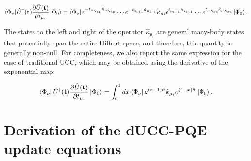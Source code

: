 \documentclass[aps,prx, reprint]{revtex4-2}
\newcommand*{\qucc}{dUCC\xspace}
\begin{document}
\begin{widetext}
\begin{equation}
\begin{split}
\bra{\Phi_\nu} \hat{U}^\dagger(\mathbf{t}) \frac{\partial \hat{U}(\mathbf{t})}{\partial t_{\mu_i}}  \ket{\Phi_0}
=
\bra{\Phi_\nu}
e^{-t_{\mu_{N_\mathrm{op}}} \hat{\kappa}_{\mu_{N_\mathrm{op}}}}
\cdots
e^{-t_{\mu_{i+1}} \hat{\kappa}_{\mu_{i+1}}}
\hat{\kappa}_{\mu_i}
e^{t_{\mu_{i+1}} \hat{\kappa}_{\mu_{i+1}}}
\cdots
e^{t_{\mu_{N_\mathrm{op}}} \hat{\kappa}_{\mu_{N_\mathrm{op}}}}\ket{\Phi_0}.
\end{split}
\end{equation}
\end{widetext}
The states to the left and right of the operator $\hat{\kappa}_{\mu_i}$ are general many-body states that potentially span the entire Hilbert space, and therefore, this quantity is generally non-null.
For completeness, we also report the same expression for the case of traditional UCC, which may be obtained using the derivative of the exponential map:
\begin{widetext}
\begin{equation}
\begin{split}
\bra{\Phi_\nu} \hat{U}^\dagger(\mathbf{t}) \frac{\partial \hat{U}(\mathbf{t})}{\partial t_{\mu_i}}  \ket{\Phi_0}
=
\int_0^1
dx
\bra{\Phi_\nu}
e^{(x - 1)\hat{\sigma}}
\hat{\kappa}_{\mu_i}
e^{(1-x)\hat{\sigma}}
\ket{\Phi_0}.
\end{split}
\end{equation}
\end{widetext}


\section{Derivation of the \qucc-PQE update equations}
\label{sec:appC}
\end{document}

